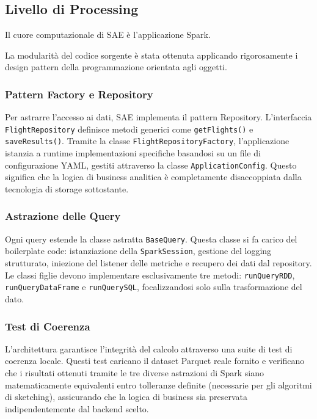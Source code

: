 \documentclass[conference]{IEEEtran}
\begin{document}
\subsection{Livello di Processing}\label{subsec:processing_layer}
Il cuore computazionale di SAE è l'applicazione Spark.

La modularità del codice sorgente è stata ottenuta applicando rigorosamente i design pattern della programmazione orientata agli oggetti\@.

\subsubsection{Pattern Factory e Repository}
Per astrarre l'accesso ai dati, SAE implementa il pattern Repository.
L'interfaccia \texttt{FlightRepository} definisce metodi generici come \texttt{getFlights()} e \texttt{saveResults()}.
Tramite la classe \texttt{FlightRepositoryFactory}, l'applicazione istanzia a runtime implementazioni specifiche basandosi su un file di configurazione YAML, gestiti attraverso la classe \texttt{ApplicationConfig}.
Questo significa che la logica di business analitica è completamente disaccoppiata dalla tecnologia di storage sottostante\@.

\subsubsection{Astrazione delle Query}
Ogni query estende la classe astratta \texttt{BaseQuery}.
Questa classe si fa carico del boilerplate code: istanziazione della \texttt{SparkSession}, gestione del logging strutturato, iniezione del listener delle metriche e recupero dei dati dal repository.
Le classi figlie devono implementare esclusivamente tre metodi: \texttt{runQueryRDD}, \texttt{runQueryDataFrame} e \texttt{runQuerySQL}, focalizzandosi solo sulla trasformazione del dato\@.

\subsubsection{Test di Coerenza}
L'architettura garantisce l'integrità del calcolo attraverso una suite di test di coerenza locale.
Questi test caricano il dataset Parquet reale fornito e verificano che i risultati ottenuti tramite le tre diverse astrazioni di Spark siano matematicamente equivalenti entro tolleranze definite (necessarie per gli algoritmi di sketching), assicurando che la logica di business sia preservata indipendentemente dal backend scelto\@.
\end{document}
